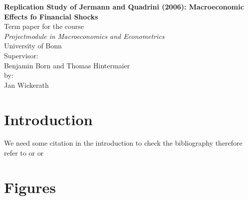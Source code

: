\documentclass[a4paper,12pt,titlepage]{article}
\begin{document}
\begin{titlepage}
\begin{center}

\textbf{\Huge Replication Study of Jermann and Quadrini (2006): Macroeconomic
  Effects fo Financial Shocks}
\\[5cm]
\Large 
Term paper for the course\\
\textit{Projectmodule in Macroeconomics and Econometrics}\\
University of Bonn\\
\vfill
Supervisor: \\
Benjamin Born and Thomas Hintermaier\\[2cm]

by:\\
Jan Wickerath\\


\end{center}
\end{titlepage}

\thispagestyle{empty}
\tableofcontents

\newpage

\setcounter{page}{1}

\thispagestyle{empty}

\section{Introduction}
\label{sec:intro}

We need some citation in the introduction to check the bibliography therefore
refer to \cite{Eggertsson_Krugman_QJE2012} or
\textcite{Eggertsson_Krugman_QJE2012} or \parencite{Eggertsson_Krugman_QJE2012}
% 
% 
% 
% 
% 
\newpage

\appendix


\section{Figures}

\newpage
\printbibliography
% 
% 
\end{document}
